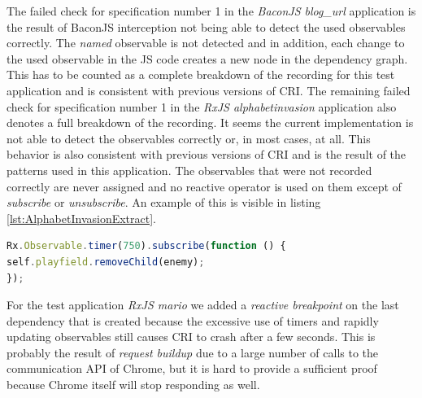 The failed check for specification number 1 in the \emph{BaconJS blog\_url} application is the result of BaconJS interception not being able to detect the used observables correctly. The \emph{named} observable is not detected and in addition, each change to the used observable in the JS code creates a new node in the dependency graph. This has to be counted as a complete breakdown of the recording for this test application and is consistent with previous versions of CRI. The remaining failed check for specification number 1 in the \emph{RxJS alphabetinvasion} application also denotes a full breakdown of the recording. It seems the current implementation is not able to detect the observables correctly or, in most cases, at all. This behavior is also consistent with previous versions of CRI and is the result of the patterns used in this application. The observables that were not recorded correctly are never assigned and no reactive operator is used on them except of \emph{subscribe} or \emph{unsubscribe}. An example of this is visible in listing \ref{lst:AlphabetInvasionExtract}.

\begin{lstlisting}[language=JavaScript, caption={Extract of RxJS AlphabetInvasion test application.},label={lst:AlphabetInvasionExtract}]
Rx.Observable.timer(750).subscribe(function () {
self.playfield.removeChild(enemy);
});	
\end{lstlisting}

For the test application \emph{RxJS mario} we added a \emph{reactive breakpoint} on the last dependency that is created because the excessive use of timers and rapidly updating observables still causes CRI to crash after a few seconds. This is probably the result of \emph{request buildup} due to a large number of calls to the communication API of Chrome, but it is hard to provide a sufficient proof because Chrome itself will stop responding as well.

